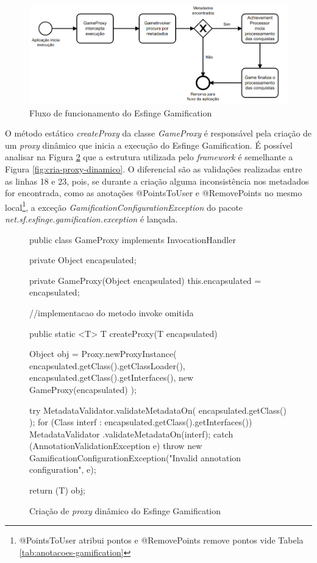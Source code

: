 \begin{figure}[H]
    \centering
    \includegraphics[scale=0.5]{src/imagens/cap2/bpmn-gamification.png}
    \caption{Fluxo de funcionamento do Esfinge Gamification}
    \label{fig:diagrama-funcionamento-gamification}
\end{figure}

\par O método estático \textit{createProxy} da classe \textit{GameProxy} é responsável pela criação de um \textit{proxy} dinâmico que inicia a execução do Esfinge Gamification. É possível analisar na Figura \ref{fig:gamification-proxy} que a estrutura utilizada pelo \textit{framework} é semelhante a Figura \ref{fig:cria-proxy-dinamico}. O diferencial são as validações realizadas entre as linhas 18 e 23, pois, se durante a criação alguma inconsistência nos metadados for encontrada, como as anotações @PointsToUser e  @RemovePoints no mesmo local\footnote{@PointsToUser atribui pontos e @RemovePoints remove pontos vide Tabela \ref{tab:anotacoes-gamification}}, a exceção \textit{GamificationConfigurationException} do pacote \textit{net.sf.esfinge.gamification.exception} é lançada. 

\begin{figure}[H]
    \centering
    \begin{java}
public class GameProxy implements InvocationHandler {
        private Object encapsulated;

	private GameProxy(Object encapsulated) {
		this.encapsulated = encapsulated;
        }
        
//implementacao do metodo invoke omitida
    
	public static <T> T createProxy(T encapsulated) {
		Object obj = Proxy.newProxyInstance(
		        encapsulated.getClass().getClassLoader(),
			encapsulated.getClass().getInterfaces(), 
			new GameProxy(encapsulated)
		);

		try {
			MetadataValidator.validateMetadataOn(
			    encapsulated.getClass()
			);
			for (Class interf : encapsulated.getClass().getInterfaces()) {
				MetadataValidator
				.validateMetadataOn(interf);
			}
		} catch (AnnotationValidationException e) {
			throw new GamificationConfigurationException("Invalid annotation configuration", e);
		}

		return (T) obj;
	}
}
    \end{java}
    \caption{Criação de \textit{proxy} dinâmico do Esfinge Gamification}
    \label{fig:gamification-proxy}
\end{figure}

